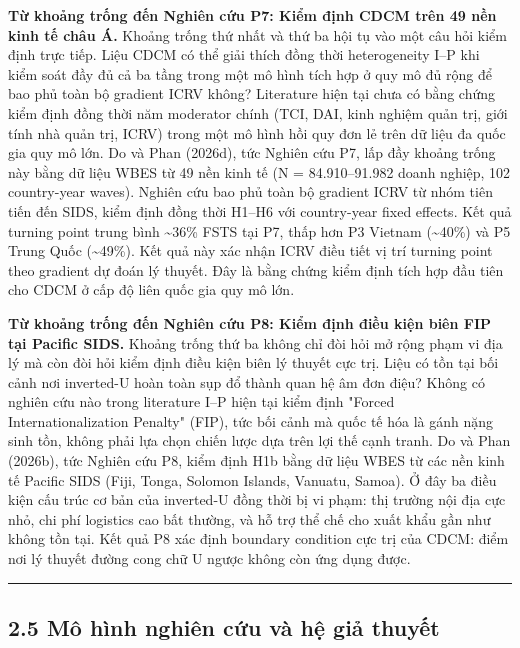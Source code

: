 \documentclass[12pt,a4paper]{article}
\begin{document}
\textbf{Từ khoảng trống đến Nghiên cứu P7: Kiểm định CDCM trên 49 nền
kinh tế châu Á.} Khoảng trống thứ nhất và thứ ba hội tụ vào một câu hỏi
kiểm định trực tiếp. Liệu CDCM có thể giải thích đồng thời heterogeneity
I--P khi kiểm soát đầy đủ cả ba tầng trong một mô hình tích hợp ở quy mô
đủ rộng để bao phủ toàn bộ gradient ICRV không? Literature hiện tại chưa
có bằng chứng kiểm định đồng thời năm moderator chính (TCI, DAI, kinh
nghiệm quản trị, giới tính nhà quản trị, ICRV) trong một mô hình hồi quy
đơn lẻ trên dữ liệu đa quốc gia quy mô lớn. Do và Phan (2026d), tức
Nghiên cứu P7, lấp đầy khoảng trống này bằng dữ liệu WBES từ 49 nền kinh
tế (N = 84.910--91.982 doanh nghiệp, 102 country-year waves). Nghiên cứu
bao phủ toàn bộ gradient ICRV từ nhóm tiên tiến đến SIDS, kiểm định đồng
thời H1--H6 với country-year fixed effects. Kết quả turning point trung
bình \textasciitilde36\% FSTS tại P7, thấp hơn P3 Vietnam
(\textasciitilde40\%) và P5 Trung Quốc (\textasciitilde49\%). Kết quả
này xác nhận ICRV điều tiết vị trí turning point theo gradient dự đoán
lý thuyết. Đây là bằng chứng kiểm định tích hợp đầu tiên cho CDCM ở cấp
độ liên quốc gia quy mô lớn.

\textbf{Từ khoảng trống đến Nghiên cứu P8: Kiểm định điều kiện biên FIP
tại Pacific SIDS.} Khoảng trống thứ ba không chỉ đòi hỏi mở rộng phạm vi
địa lý mà còn đòi hỏi kiểm định điều kiện biên lý thuyết cực trị. Liệu
có tồn tại bối cảnh nơi inverted-U hoàn toàn sụp đổ thành quan hệ âm đơn
điệu? Không có nghiên cứu nào trong literature I--P hiện tại kiểm định
"Forced Internationalization Penalty" (FIP), tức bối cảnh mà quốc tế hóa
là gánh nặng sinh tồn, không phải lựa chọn chiến lược dựa trên lợi thế
cạnh tranh. Do và Phan (2026b), tức Nghiên cứu P8, kiểm định H1b bằng dữ
liệu WBES từ các nền kinh tế Pacific SIDS (Fiji, Tonga, Solomon Islands,
Vanuatu, Samoa). Ở đây ba điều kiện cấu trúc cơ bản của inverted-U đồng
thời bị vi phạm: thị trường nội địa cực nhỏ, chi phí logistics cao bất
thường, và hỗ trợ thể chế cho xuất khẩu gần như không tồn tại. Kết quả
P8 xác định boundary condition cực trị của CDCM: điểm nơi lý thuyết
đường cong chữ U ngược không còn ứng dụng được.

\begin{center}\rule{0.5\linewidth}{0.5pt}\end{center}

\hypertarget{25-muxf4-huxecnh-nghiuxean-cux1ee9u-vuxe0-hux1ec7-giux1ea3-thuyux1ebft}{%
\subsection{2.5 Mô hình nghiên cứu và hệ giả
thuyết}\label{25-muxf4-huxecnh-nghiuxean-cux1ee9u-vuxe0-hux1ec7-giux1ea3-thuyux1ebft}}
\end{document}
